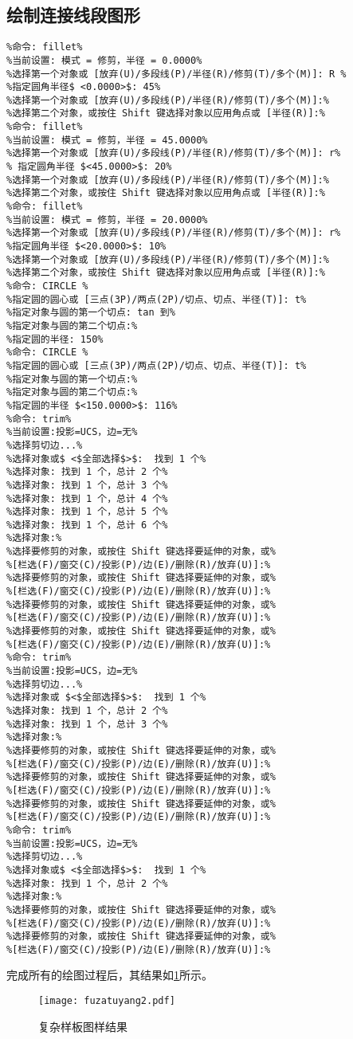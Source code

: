 \subsection{绘制连接线段图形}
\begin{lstlisting}
%命令: fillet%
%当前设置: 模式 = 修剪，半径 = 0.0000%
%选择第一个对象或 [放弃(U)/多段线(P)/半径(R)/修剪(T)/多个(M)]: R %
%指定圆角半径$ <0.0000>$: 45%
%选择第一个对象或 [放弃(U)/多段线(P)/半径(R)/修剪(T)/多个(M)]:%
%选择第二个对象，或按住 Shift 键选择对象以应用角点或 [半径(R)]:%
%命令: fillet%
%当前设置: 模式 = 修剪，半径 = 45.0000%
%选择第一个对象或 [放弃(U)/多段线(P)/半径(R)/修剪(T)/多个(M)]: r%
% 指定圆角半径 $<45.0000>$: 20%
%选择第一个对象或 [放弃(U)/多段线(P)/半径(R)/修剪(T)/多个(M)]:%
%选择第二个对象，或按住 Shift 键选择对象以应用角点或 [半径(R)]:%
%命令: fillet%
%当前设置: 模式 = 修剪，半径 = 20.0000%
%选择第一个对象或 [放弃(U)/多段线(P)/半径(R)/修剪(T)/多个(M)]: r%
%指定圆角半径 $<20.0000>$: 10%
%选择第一个对象或 [放弃(U)/多段线(P)/半径(R)/修剪(T)/多个(M)]:%
%选择第二个对象，或按住 Shift 键选择对象以应用角点或 [半径(R)]:%
%命令: CIRCLE %
%指定圆的圆心或 [三点(3P)/两点(2P)/切点、切点、半径(T)]: t%
%指定对象与圆的第一个切点: tan 到%
%指定对象与圆的第二个切点:%
%指定圆的半径: 150%
%命令: CIRCLE %
%指定圆的圆心或 [三点(3P)/两点(2P)/切点、切点、半径(T)]: t%
%指定对象与圆的第一个切点:%
%指定对象与圆的第二个切点:%
%指定圆的半径 $<150.0000>$: 116%
%命令: trim%
%当前设置:投影=UCS，边=无%
%选择剪切边...%
%选择对象或$ <$全部选择$>$:  找到 1 个%
%选择对象: 找到 1 个，总计 2 个%
%选择对象: 找到 1 个，总计 3 个%
%选择对象: 找到 1 个，总计 4 个%
%选择对象: 找到 1 个，总计 5 个%
%选择对象: 找到 1 个，总计 6 个%
%选择对象:%
%选择要修剪的对象，或按住 Shift 键选择要延伸的对象，或%
%[栏选(F)/窗交(C)/投影(P)/边(E)/删除(R)/放弃(U)]:%
%选择要修剪的对象，或按住 Shift 键选择要延伸的对象，或%
%[栏选(F)/窗交(C)/投影(P)/边(E)/删除(R)/放弃(U)]:%
%选择要修剪的对象，或按住 Shift 键选择要延伸的对象，或%
%[栏选(F)/窗交(C)/投影(P)/边(E)/删除(R)/放弃(U)]:%
%选择要修剪的对象，或按住 Shift 键选择要延伸的对象，或%
%[栏选(F)/窗交(C)/投影(P)/边(E)/删除(R)/放弃(U)]:%
%命令: trim%
%当前设置:投影=UCS，边=无%
%选择剪切边...%
%选择对象或 $<$全部选择$>$:  找到 1 个%
%选择对象: 找到 1 个，总计 2 个%
%选择对象: 找到 1 个，总计 3 个%
%选择对象:%
%选择要修剪的对象，或按住 Shift 键选择要延伸的对象，或%
%[栏选(F)/窗交(C)/投影(P)/边(E)/删除(R)/放弃(U)]:%
%选择要修剪的对象，或按住 Shift 键选择要延伸的对象，或%
%[栏选(F)/窗交(C)/投影(P)/边(E)/删除(R)/放弃(U)]:%
%选择要修剪的对象，或按住 Shift 键选择要延伸的对象，或%
%[栏选(F)/窗交(C)/投影(P)/边(E)/删除(R)/放弃(U)]:%
%命令: trim%
%当前设置:投影=UCS，边=无%
%选择剪切边...%
%选择对象或$ <$全部选择$>$:  找到 1 个%
%选择对象: 找到 1 个，总计 2 个%
%选择对象:%
%选择要修剪的对象，或按住 Shift 键选择要延伸的对象，或%
%[栏选(F)/窗交(C)/投影(P)/边(E)/删除(R)/放弃(U)]:%
%选择要修剪的对象，或按住 Shift 键选择要延伸的对象，或%
%[栏选(F)/窗交(C)/投影(P)/边(E)/删除(R)/放弃(U)]:%

\end{lstlisting}
完成所有的绘图过程后，其结果如\ref{fig:fuzatuyang2}所示。
\begin{figure}[htbp]
\centering
\texttt{[image: fuzatuyang2.pdf]}
\caption{复杂样板图样结果}\label{fig:fuzatuyang2}
\end{figure}
\endinput
